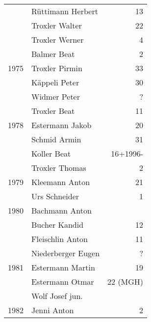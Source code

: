{\begin{longtable}{ l l r }
                      & Rüttimann Herbert                         & 13          \\
                      & Troxler Walter                            & 22          \\
                      & Troxler Werner                            & 4           \\
                      & Balmer Beat                               & 2           \\
        1975          & Troxler Pirmin                            & 33          \\
                      & Käppeli Peter                             & 30          \\
                      & Widmer Peter                              & ?           \\
                      & Troxler Beat                              & 11          \\
        1978          & Estermann Jakob                           & 20          \\
                      & Schmid Armin                              & 31          \\
                      & Koller Beat                               & 16+1996-    \\
                      & Troxler Thomas                            & 2           \\
        1979          & Kleemann Anton                            & 21          \\
                      & Urs Schneider                             & 1           \\
        1980          & Bachmann Anton                            &             \\
                      & Bucher Kandid                             & 12          \\
                      & Fleischlin Anton                          & 11          \\
                      & Niederberger Eugen                        & ?           \\
        1981          & Estermann Martin                          & 19          \\
                      & Estermann Otmar                           & 22 (MGH)    \\
                      & Wolf Josef jun.                           &             \\
        1982          & Jenni Anton                               & 2           \\

\end{longtable}}
